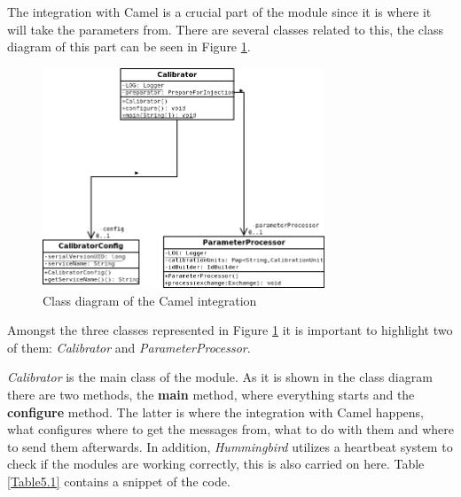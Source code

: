 The integration with Camel is a crucial part of the module since it is where it will take the parameters from. There are several classes related to this, the class diagram of this part can be seen in Figure \ref{f5.1}. 

\begin{figure}[H]
\centerline{\includegraphics[width=0.75\textwidth]{images/CalibratorCamelClassDiagram.png}}
\caption{Class diagram of the Camel integration}
\label{f5.1}
\end{figure}

Amongst the three classes represented in Figure \ref{f5.1} it is important to highlight two of them: \emph{Calibrator} and \emph{ParameterProcessor}.

\emph{Calibrator} is the main class of the module. As it is shown in the class diagram there are two methods, the \textbf{main} method, where everything starts and the \textbf{configure} method. The latter is where the integration with Camel happens, what configures where to get the messages from, what to do with them and where to send them afterwards. In addition, \emph{Hummingbird} utilizes a heartbeat system to check if the modules are working correctly, this is also carried on here. Table \ref{Table5.1} contains a snippet of the code.

